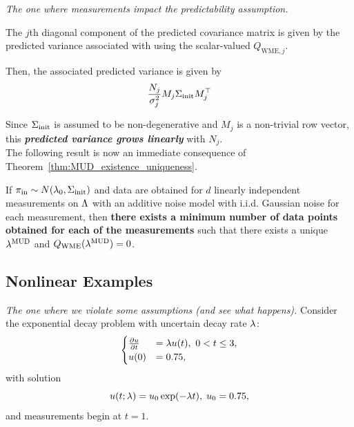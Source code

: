 \begin{frame}{\it The one where measurements impact the predictability assumption.}

The $j$th diagonal component of the predicted covariance matrix is given by the predicted variance associated with using the scalar-valued $Q_{\text{WME},j}$.

Then, the associated predicted variance is given by
\begin{equation}
	\frac{N_j}{\sigma_j^2} M_j\Sigma_\text{init} M_j^\top
\end{equation}

Since $\Sigma_\text{init}$ is assumed to be non-degenerative and $M_j$ is a non-trivial row vector, this {\it \bf predicted variance grows linearly} with $N_j$.\\

\bigskip
The following result is now an immediate consequence of Theorem~\ref{thm:MUD_existence_uniqueness}.
\end{frame}

\begin{frame}

\begin{corollary}\label{cor:MUD_wme}
If $\operatorname*{\pi_{in}} \sim N(\lambda_0,\Sigma_\text{init})$ and data are obtained for $d$ linearly independent measurements on ${\Lambda}$ with an additive noise model with i.i.d. Gaussian noise for each measurement, then {\bf there exists a minimum number of data points obtained for each of the measurements} such that there exists a unique $\lambda^{\text{MUD}}$ and $Q_\text{WME}(\lambda^{\text{MUD}}) = 0$.
\end{corollary}

\end{frame}



\subsection{Nonlinear Examples}

\begin{frame}{\it The one where we violate some assumptions (and see what happens).}
\centering
Consider the exponential decay problem with uncertain decay rate $\lambda$:
$$
\begin{cases}
\frac{\partial u}{\partial t} & = \lambda u(t), \ 0<t\leq 3, \\ u(0) &= 0.75,
\end{cases}
$$
with solution
\begin{equation}
u(t;\lambda) = u_0\exp(-\lambda t), \; u_0 = 0.75 ,
\end{equation}
and measurements begin at $t=1$.
\end{frame}


